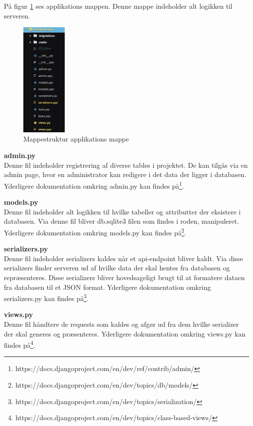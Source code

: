 \newpage

På figur \ref{fig:mappestruktur_3} ses applikations mappen. Denne mappe indeholder alt logikken til serveren.

\begin{figure}[H]
	\centering
	\includegraphics[width=0.2\textwidth]{Billeder/implementation/mappestruktur_3.png}
	\caption{Mappestruktur applikations mappe}
	\label{fig:mappestruktur_3}
\end{figure}

\textbf{admin.py} \\
Denne fil indeholder registrering af diverse tables i projektet. De kan tilgås via en admin page, hvor en administrator kan redigere i det data der ligger i databasen. Yderligere dokumentation omkring admin.py kan findes på\footnote{https://docs.djangoproject.com/en/dev/ref/contrib/admin/}.

\textbf{models.py} \\
Denne fil indeholder alt logikken til hvilke tabeller og attributter der eksistere i databasen. Via denne fil bliver db.sqlite3 filen som findes i roden, manipuleret. Yderligere dokumentation omkring models.py kan findes på\footnote{https://docs.djangoproject.com/en/dev/topics/db/models/}.

\textbf{serializers.py} \\
Denne fil indeholder serializers kaldes når et api-endpoint bliver kaldt. Via disse serializers finder serveren ud af hvilke data der skal hentes fra databasen og repræsenteres. Disse serializers bliver hovedsageligt brugt til at formatere dataen fra databasen til et JSON format. Yderligere dokumentation omkring serializers.py kan findes på\footnote{https://docs.djangoproject.com/en/dev/topics/serialization/}.

\textbf{views.py} \\
Denne fil håndtere de requests som kaldes og afgør ud fra dem hvilke serializer der skal generes og præsenteres. Yderligere dokumentation omkring views.py kan findes på\footnote{https://docs.djangoproject.com/en/dev/topics/class-based-views/}.
\newpage

